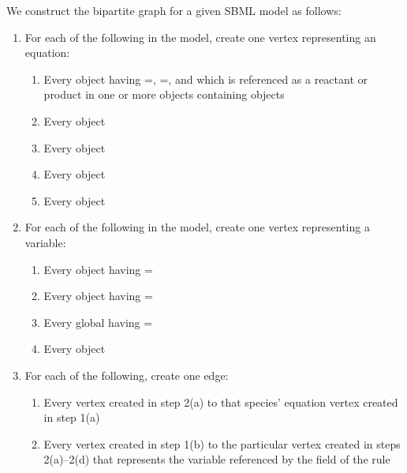 We construct the bipartite graph for a given SBML model as follows:
\begin{enumerate}

\item For each of the following in the model, create one vertex
  representing an equation:
  \begin{enumerate}
    
  \item Every \Species object having
    =,
    =, and which is referenced as a
    reactant or product in one or more \Reaction objects
    containing \KineticLaw objects

  \item Every \AssignmentRule object

  \item Every \RateRule object

  \item Every \AlgebraicRule object

  \item Every \KineticLaw object

  \end{enumerate}
  
\item For each of the following in the model, create one vertex
  representing a variable:
  \begin{enumerate}

  \item Every \Species object having =
  \item Every \Compartment object having =
  \item Every global \Parameter having =
  \item Every \Reaction object

  \end{enumerate}
  
\item For each of the following, create one edge:
  \begin{enumerate}
    
  \item Every vertex created in step 2(a) to that species'
    equation vertex created in step 1(a)
    
  \item Every vertex created in step 1(b) to the particular vertex
    created in steps 2(a)--2(d) that represents the variable
    referenced by the  field of the rule
    

\end{enumerate}
\end{enumerate}
